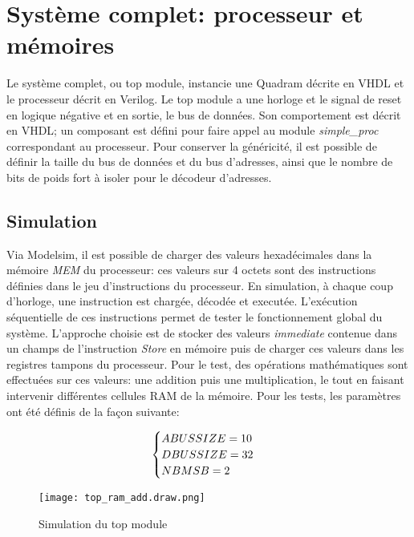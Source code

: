 \section{Système complet: processeur et mémoires}

Le système complet, ou top module, instancie une Quadram décrite en VHDL et le processeur décrit en Verilog. Le top module a une horloge et le signal de reset en logique négative et en sortie, le bus de données. 
Son comportement est décrit en VHDL; un composant est défini pour faire appel au module \textit{simple\_proc} correspondant au processeur.
Pour conserver la généricité, il est possible de définir la taille du bus de données et du bus d'adresses, ainsi que le nombre de bits de poids fort à isoler pour le décodeur d'adresses. \\

\subsection{Simulation}

\indent Via Modelsim, il est possible de charger des valeurs hexadécimales dans la mémoire \textit{MEM} du processeur: ces valeurs sur 4 octets sont des instructions définies dans le jeu d'instructions du processeur.
En simulation, à chaque coup d'horloge, une instruction est chargée, décodée et executée. L'exécution séquentielle de ces instructions permet de tester le fonctionnement global du système.
L'approche choisie est de stocker des valeurs \textit{immediate} contenue dans un champs de l'instruction \textit{Store} en mémoire puis de charger ces valeurs dans les registres tampons du processeur.
Pour le test, des opérations mathématiques sont effectuées sur ces valeurs: une addition puis une multiplication, le tout en faisant intervenir différentes cellules \gls{RAM} de la mémoire.
Pour les tests, les paramètres ont été définis de la façon suivante:

\begin{equation}
	\notag
	 \begin{cases}
		ABUS SIZE = 10 & \\
		DBUS SIZE = 32 & \\
		NB MSB = 2
	\end{cases}
\end{equation}

\begin{figure}[h]
	\centering
	\texttt{[image: top\_ram\_add.draw.png]}
	\caption{Simulation du top module}
	\label{fig:wave_top_module}
\end{figure}

